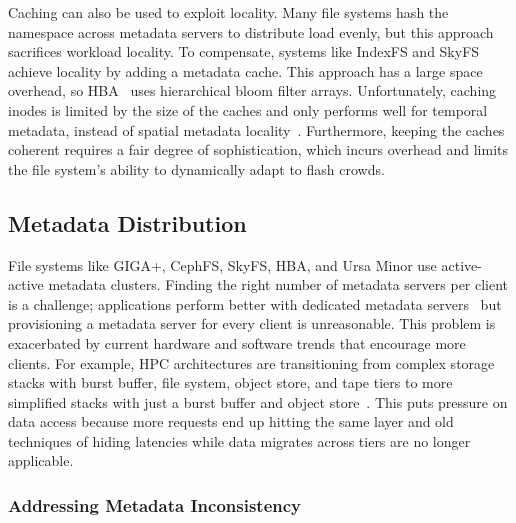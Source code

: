 Caching can also be used to exploit locality.  Many file systems hash the
namespace across metadata servers to distribute load evenly, but this approach
sacrifices workload locality. To compensate, systems like IndexFS and
SkyFS~\cite{xing:sc2009-skyfs} achieve locality by adding a metadata cache.
This approach has a large space overhead, so HBA~\cite{zhu:pds2008-hba} uses
hierarchical bloom filter arrays. Unfortunately, caching inodes is limited by
the size of the caches and only performs well for temporal metadata, instead of
spatial metadata locality~\cite{weil:sc2004-dyn-metadata, sevilla:sc15-mantle,
li:msst2006-dynamic}.  Furthermore, keeping the caches coherent requires a fair
degree of sophistication, which incurs overhead and limits the file system's
ability to dynamically adapt to flash crowds.

\subsection{Metadata Distribution}

File systems like GIGA+, CephFS, SkyFS, HBA, and Ursa Minor use active-active
metadata clusters. Finding the right number of metadata servers per client is a
challenge; applications perform better with dedicated metadata
servers~\cite{sevilla:sc15-mantle, ren:sc2014-indexfs} but provisioning a
metadata server for every client is unreasonable.  This problem is exacerbated
by current hardware and software trends that encourage more clients. For
example, HPC architectures are transitioning from complex storage stacks with
burst buffer, file system, object store, and tape tiers to more simplified
stacks with just a burst buffer and object
store~\cite{bent:login16-hpc-trends}. This puts pressure on data access because
more requests end up hitting the same layer and old techniques of hiding
latencies while data migrates across tiers are no longer applicable.

\subsubsection{Addressing Metadata Inconsistency}

